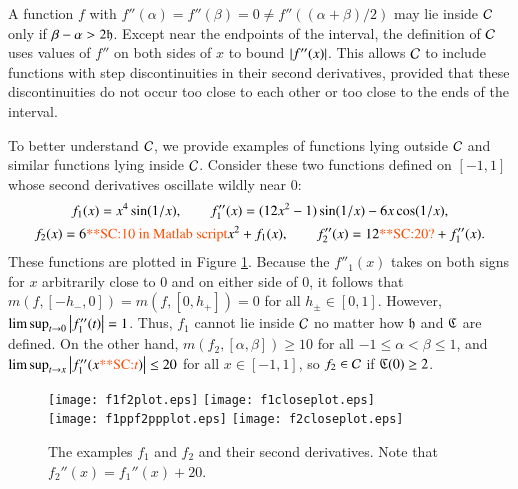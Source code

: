 \documentclass[review]{elsarticle}
\newcommand{\scnote}[1]{ {\textcolor{orange}  {\mbox{**SC:} #1}}}
\begin{document}
A function $f$ with $f''(\alpha) = f''(\beta) = 0 \ne f''((\alpha+\beta)/2)$ may
lie inside $\mathcal{C}$ only if $\beta - \alpha > 2\mathfrak{h}$. Except near the endpoints of
the interval, the definition of $\mathcal{C}$ uses values of $f''$ on both sides of $x$
to bound $\left \lvert f''(x) \right \rvert$. This allows $\mathcal{C}$ to include functions with step
discontinuities in their second derivatives, provided that these discontinuities
do not occur too close to each other or too close to the ends of the interval.

To better understand $\mathcal{C}$, we provide examples of functions lying outside $\mathcal{C}$
and similar functions lying inside $\mathcal{C}$. Consider these two functions defined
on $[-1,1]$ whose second derivatives oscillate wildly near $0$:
\begin{gather*}
f_1(x) = x^4 \sin(1/x), \qquad f_1''(x) = (12x^2 - 1) \sin(1/x) -6 x \cos(1/x), \\
f_2(x) = 6 \scnote{10 \mbox{ in Matlab script}} x^2 + f_1(x), \qquad f_2''(x) = 12 \scnote{20?}+ f_1''(x).
\end{gather*}
These functions are plotted in Figure \ref{f1f2fig}. Because the $f''_1(x)$
takes on both signs for $x$ arbitrarily close to $0$ and on either side of $0$,
it follows that $m(f,[-h_-,0]) = m(f,[0,h_+]) = 0$ for all $h_\pm \in [0,1]$.
However, $\limsup_{t \to 0} \left \lvert f''_1(t) \right \rvert = 1$. Thus, $f_1$ cannot lie inside
$\mathcal{C}$ no matter how $\mathfrak{h}$ and $\mathfrak{C}$ are defined. On the other hand,
$m(f_2,[\alpha, \beta]) \ge 10$ for all $-1 \le \alpha < \beta \le 1$, and
$\limsup_{t \to x} \abs{f''_1(x \scnote{t})} \le 20$ for all $x \in [-1,1]$, so $f_2 \in
\mathcal{C}$ if $\mathfrak{C}(0) \ge 2$.

\begin{figure}[t]
\centering
\texttt{[image: f1f2plot.eps]} \qquad
\texttt{[image: f1closeplot.eps]} \\
\texttt{[image: f1ppf2ppplot.eps]} \qquad
\texttt{[image: f2closeplot.eps]}
\caption{The examples $f_1$ and $f_2$ and their second derivatives. Note that
$f_2''(x) = f_1''(x) + 20$.}
\label{f1f2fig}
\end{figure}
\end{document}
